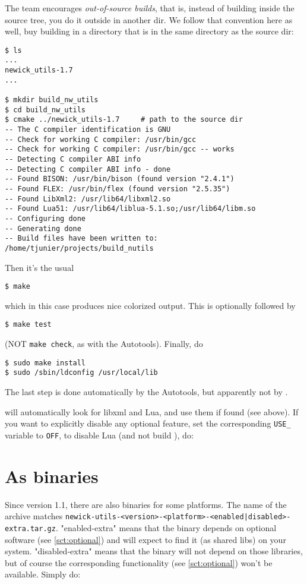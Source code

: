 The \cmake{} team encourages \emph{out-of-source builds}, that is, instead of
building inside the source tree, you do it outside in another dir. We follow
that convention here as well, buy building in a directory that is in the same
directory as the \nutils{} source dir:

\begin{verbatim}
$ ls
...
newick_utils-1.7
...

$ mkdir build_nw_utils
$ cd build_nw_utils
$ cmake ../newick_utils-1.7		# path to the source dir
-- The C compiler identification is GNU
-- Check for working C compiler: /usr/bin/gcc
-- Check for working C compiler: /usr/bin/gcc -- works
-- Detecting C compiler ABI info
-- Detecting C compiler ABI info - done
-- Found BISON: /usr/bin/bison (found version "2.4.1")
-- Found FLEX: /usr/bin/flex (found version "2.5.35")
-- Found LibXml2: /usr/lib64/libxml2.so 
-- Found Lua51: /usr/lib64/liblua-5.1.so;/usr/lib64/libm.so 
-- Configuring done
-- Generating done
-- Build files have been written to: /home/tjunier/projects/build_nutils
\end{verbatim}

Then it's the usual
\begin{verbatim}
$ make
\end{verbatim}
which in this case produces nice colorized output. This is optionally followed
by 
\begin{verbatim}
$ make test
\end{verbatim}
(NOT \texttt{make check}, as with the Autotools). Finally, do
\begin{verbatim}
$ sudo make install
$ sudo /sbin/ldconfig /usr/local/lib
\end{verbatim}
The last step is done automatically by the Autotools, but apparently not by
\cmake.

\cmake{} will automatically look for libxml and Lua, and use them if found (see
above). If you want to explicitly disable any optional feature, set the
corresponding \texttt{USE\_} variable to \texttt{OFF}, \eg{} to disable Lua (and
not build \luaed), do:



\section{As binaries}

Since version 1.1, there are also binaries for some platforms. The name of the
archive matches
\texttt{newick-utils-<version>-<platform>-<enabled|disabled>-extra.tar.gz}.
"enabled-extra" means that the binary depends on optional software (see
\ref{sct:optional})  and will expect to find it (as shared libs) on your
system. "disabled-extra" means that the binary will not depend on those
libraries, but of course the corresponding functionality (see
\ref{sct:optional}) won't be available. Simply do: 

